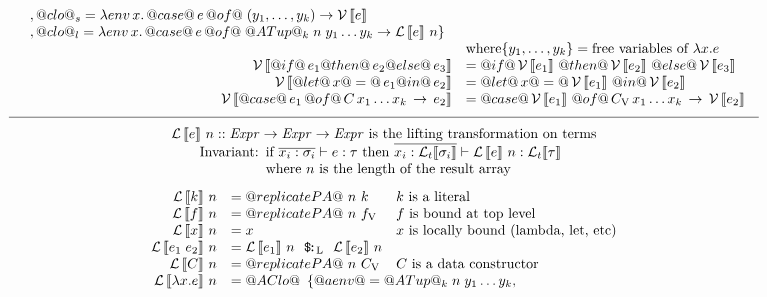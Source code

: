 \begin{figure*}
$$\begin{array}{c}
\begin{array}{rll}
{\begin{array}[t]{l}
              , @clo@_s = \lambda env\,x.\,
                 @case@\,e\,@of@\;(y_1,\dots,y_k) \to \VT{e} \\
              , @clo@_l = \lambda env\,x.\,
                 @case@\, e\, @of@\; @ATup@_k\; n\; y_1 \dots y_k \to \LT{n}{e} \}
           \end{array}} \\
 & \multicolumn{2}{l}{\mbox{where} \{y_1, \ldots, y_k\} = \mbox{free variables of $\lambda x.e$}} \\
\VT{@if@\,e_1  @then@ \,e_2 @else@ \, e_3} & 
\multicolumn{2}{l}{= @if@\,\VT{e_1}\,@then@\,\VT{e_2}\,@else@\,\VT{e_3}} \\
\VT{@let@\, x @=@ \,e_1  @in@ \,e_2} & 
\multicolumn{2}{l}{= @let@\, x @=@ \,\VT{e_1}\,@in@\,\VT{e_2}} \\
\VT{@case@\,e_1 \, @of@ \,C\,x_1 \ldots x_k \, \rightarrow \,e_2} & 
\multicolumn{2}{l}{= @case@\, \VT{e_1}\, @of@\, \VV{C} \,x_1 \ldots x_k\, \rightarrow \,\VT{e_2}} \\
\end{array} \\ \\[-2mm]
 \hline \\[-2mm]
\mbox{$ \LT{n}{e}:: \mathit{Expr} \to \mathit{Expr} \to \mathit{Expr}$
is the lifting transformation on terms} \\
\mbox{Invariant:} \begin{array}[t]{l}
  \mbox{if $\tup{x_i : \sigma_i} \vdash e : \tau$ 
        then $\tup{x_i : \TTL{\sigma_i}} \vdash \LT{n}{e}: \TTL{\tau}$} \\
  \mbox{where $n$ is the length of the result array}
  \end{array} \\[2em]
\begin{array}{rll}
\LT{n}{k} & = @replicatePA@~ n~ k & \mbox{$k$ is a literal} \\
\LT{n}{f} & = @replicatePA@~ n~ \VV{f} & \mbox{$f$ is bound at top level} \\
\LT{n}{x} & = x  & \mbox{$x$ is locally bound (lambda, let, etc)} \\
\LT{n}{e_1\; e_2} & = \LT{n}{e_1}~~ \LV{\capp}~~ \LT{n}{e_2} \\
\LT{n}{C} & = @replicatePA@~ n~ \VV{C}  & \mbox{$C$ is a data constructor} \\
\LT{n}{\lambda{x}.e} & \multicolumn{2}{l}{= @AClo@ \begin{array}[t]{l}
        \{ @aenv@ = @ATup@_k\; n\; y_1 \dots y_k, \\

\end{array}}
\end{array}
\end{array}$$
\end{figure*}
